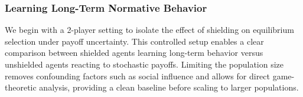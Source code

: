 \documentclass{ecai}
\newcommand{\shieldname}[1]{$\mathcal{T}_{#1}$}
\theoremstyle{plain}
\theoremstyle{definition}
\theoremstyle{remark}
\begin{document}
\subsubsection{Learning Long-Term Normative Behavior}



We begin with a 2-player setting to isolate the effect of shielding on equilibrium selection under payoff uncertainty. This controlled setup enables a clear comparison between shielded agents learning long-term behavior versus unshielded agents reacting to stochastic payoffs. Limiting the population size removes confounding factors such as social influence and allows for direct game-theoretic analysis, providing a clean baseline before scaling to larger populations.
\end{document}
